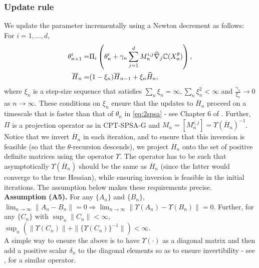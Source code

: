 \subsubsection*{Update rule}
We update the parameter incrementally using a Newton decrement as follows: For $i=1,\ldots,d$,
\begin{align}
\label{eq:2spsa}
\theta^{i}_{n+1} =& \Pi_{i}\left(\theta^{i}_n + \gamma_n \sum_{j=1}^{d} M_n^{i,j} \widehat \nabla_{j} \mathbb{C}(X^\theta_n)\right), \\
\overline H_n = & (1-\xi_n) \overline H_{n-1} + \xi_n \widehat H_n,\label{eq:2spsa-H}
\end{align}
where $\xi_n$ is a step-size sequence that satisfies 
$\sum_{n} \xi_n = \infty, \sum_n \xi_n^2 < \infty$ and $\frac{\gamma_n}{\xi_n}\rightarrow 0$ as $n\rightarrow \infty$. These conditions on $\xi_n$ ensure that the updates to $\overline H_n$ proceed on a timescale that is faster than that of $\theta_n$ in \eqref{eq:2spsa} - see Chapter 6 of \cite{borkar2008stochastic}.
Further, $\Pi$ is a projection operator as in CPT-SPSA-G and  $M_n = [M_n^{i,j}] = \Upsilon(\overline H_n)^{-1}$.
Notice that we invert $\overline H_n$ in each iteration, and to ensure that this inversion is feasible (so that the $\theta$-recursion descends), we project $\overline H_n$ onto the set of positive definite matrices using the operator $\Upsilon$. The operator has to be such that asymptotically $\Upsilon(\overline H_n)$ should be the same as $\overline H_n$ (since the latter would converge to the true Hessian), while ensuring inversion is feasible in the initial iterations.  The assumption below makes these requirements precise.\\[1ex]
\textbf{Assumption (A5).}  For any $\{A_n\}$ and $\{B_n\}$,
${\displaystyle \lim_{n\rightarrow \infty} \left\| A_n-B_n \right\|}= 0 \Rightarrow {\displaystyle \lim_{n\rightarrow \infty} \parallel \Upsilon(A_n)- \Upsilon(B_n) \parallel}= 0$. Further, for any $\{C_n\}$  with
${\displaystyle \sup_n \parallel C_n\parallel}<\infty$,
${\displaystyle \sup_n \left(\parallel \Upsilon(C_n)\parallel + \parallel \{\Upsilon(C_n)\}^{-1} \parallel\right) < \infty}$.
\\[0.5ex]
A simple way to ensure the above is to have $\Upsilon(\cdot)$ as a diagonal matrix and then add a positive scalar $\delta_n$ to the diagonal elements so as to ensure invertibility  - see \cite{gill1981practical}, \cite{spall2000adaptive} for a similar operator.

